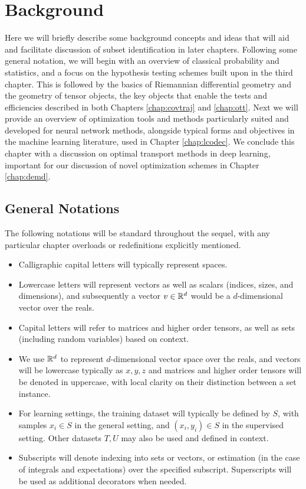 \chapter{Background}\label{chap:bknd}
Here we will briefly describe some background concepts and ideas that will aid and facilitate discussion of subset identification in later chapters. 
Following some general notation,
we will begin with an overview
of classical probability and statistics,
and a focus on the hypothesis testing
schemes built upon in the third chapter.
This is followed by the basics of Riemannian differential geometry
and the geometry of tensor objects,
the key objects that enable the 
tests and efficiencies described in both 
Chapters \ref{chap:covtraj} and \ref{chap:ott}.
Next we will provide
an overview of optimization tools
and methods particularly suited
and developed for neural network methods,
alongside typical forms and objectives 
in the machine learning literature,
used in Chapter \ref{chap:lcodec}.
We conclude this chapter
with a discussion on optimal transport
methods in deep learning, important
for our discussion of novel optimization schemes
in Chapter \ref{chap:demd}.

\section{General Notations}
The following notations will be standard throughout the sequel, with any particular chapter overloads or redefinitions explicitly mentioned.
\begin{itemize}
\item Calligraphic capital letters will typically represent spaces.

\item Lowercase letters will represent vectors as well as scalars (indices, sizes, and dimensions), and subsequently a vector $v \in \mathbb{R}^d$ would be a $d$-dimensional vector over the reals.

\item Capital letters will refer to matrices and higher order tensors, as well as sets (including random variables) based on context.

\item We use $\mathbb{R}^d$ to represent $d$-dimensional vector space over the reals, and vectors will be lowercase typically as $x,y,z$ and matrices and higher order tensors will be denoted in uppercase, with local clarity on their distinction between a set instance.

\item For learning settings, the training dataset will typically be defined by $S$, with samples $x_i \in S$ in the general setting, and $(x_i,y_i)\in S$ in the supervised setting. Other datasets $T,U$ may also be used and defined in context.

\item Subscripts will denote indexing into sets or vectors, or estimation (in the case of integrals and expectations) over the specified subscript. Superscripts will be used as additional decorators when needed.

\end{itemize}

